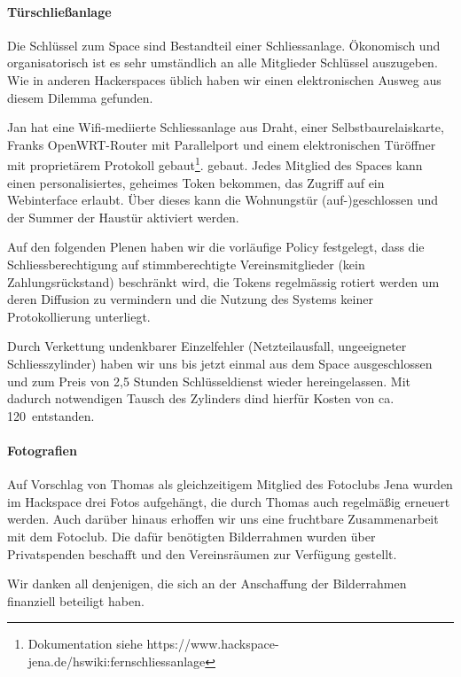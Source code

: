 \documentclass[10pt,DIV16]{scrartcl}
\begin{document}
\paragraph{Türschließanlage}

Die Schl\"ussel zum Space sind Bestandteil einer
Schliessanlage. \"Okonomisch und organisatorisch ist es sehr
umst\"andlich an alle Mitglieder Schl\"ussel auszugeben. Wie in
anderen Hackerspaces \"ublich haben wir einen elektronischen Ausweg
aus diesem Dilemma gefunden.

Jan hat eine Wifi-mediierte Schliessanlage aus Draht, einer
Selbstbaurelaiskarte, Franks OpenWRT-Router mit Parallelport und einem
elektronischen T\"ur\"offner mit propriet\"arem Protokoll
gebaut\footnote{Dokumentation siehe
  https://www.hackspace-jena.de/hswiki:fernschliessanlage}.
gebaut. Jedes Mitglied des Spaces kann einen personalisiertes,
geheimes Token bekommen, das Zugriff auf ein Webinterface
erlaubt. \"Uber dieses kann die Wohnungst\"ur (auf-)geschlossen und der
Summer der Haust\"ur aktiviert werden.

Auf den folgenden Plenen haben wir die vorl\"aufige Policy festgelegt,
dass die Schliessberechtigung auf stimmberechtigte Vereinsmitglieder
(kein Zahlungsr\"uckstand) beschr\"ankt wird, die Tokens regelm\"assig
rotiert werden um deren Diffusion zu vermindern und die Nutzung des
Systems keiner Protokollierung unterliegt.

\label{sec:tueroeffnung}
Durch Verkettung undenkbarer Einzelfehler (Netzteilausfall, 
ungeeigneter Schliesszylinder) haben wir uns bis jetzt einmal aus 
dem Space ausgeschlossen und zum Preis von 2,5 Stunden 
Schlüsseldienst wieder hereingelassen. Mit dadurch notwendigen 
Tausch des Zylinders dind hierfür Kosten von ca. 120\EUR\ entstanden. 

\paragraph{Fotografien}

Auf Vorschlag von Thomas als gleichzeitigem Mitglied des Fotoclubs
Jena wurden im Hackspace drei Fotos aufgehängt, die durch Thomas
auch regelmäßig erneuert werden.  Auch darüber hinaus erhoffen wir
uns eine fruchtbare Zusammenarbeit mit dem Fotoclub. Die dafür
benötigten Bilderrahmen wurden über Privatspenden beschafft und den
Vereinsräumen zur Verfügung gestellt.

Wir danken all denjenigen, die sich an der Anschaffung der Bilderrahmen
finanziell beteiligt haben.
\end{document}
